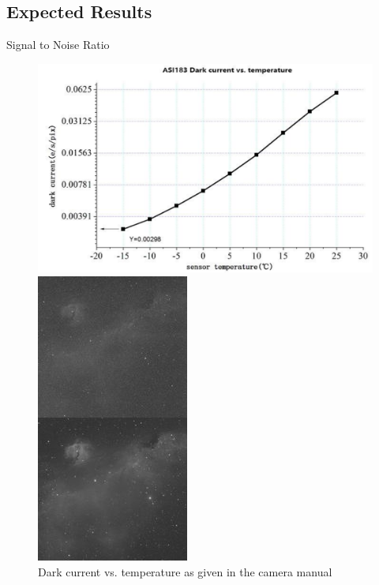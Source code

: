 \documentclass[11pt, aspectratio=169]{beamer}
\begin{document}
\subsection{Expected Results}
\begin{frame}{Signal to Noise Ratio}
\begin{figure}[!htb]
    \hspace{-2cm}
    \begin{minipage}{0.7\textwidth}
        \centering
        \includegraphics[width=0.8\linewidth]{figures/images/darkcurrent.PNG}
        \caption{Dark current vs. temperature as given in the camera manual}
    \end{minipage}%
    \begin{minipage}{0.3\textwidth}
	 	\centering
	 	\includegraphics[width=0.8\linewidth]{figures/images/Uncool-189x360.jpg}

\end{minipage}
\end{figure}
\end{frame}
\end{document}
